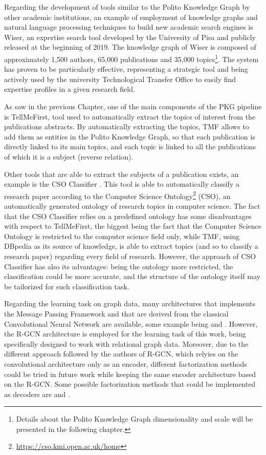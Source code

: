 \documentclass[%
    corpo=13.5pt,
    twoside,
    oldstyle,
    tipotesi=magistrale,
    greek,
    evenboxes
]{toptesi}
\begin{document}
Regarding the development of tools similar to the Polito Knowledge Graph
by other academic institutions, an example of employment of knowledge graphs
and natural language processing techniques to build new academic search engines
is Wiser\cite{cifariello2019}, an
expertise search tool developed by the University of Pisa and publicly released
at the beginning of 2019.
The knowledge graph of Wiser is composed of approximately 1,500 authors, 65,000 publications
and 35,000 topics\footnote{Details about the Polito Knowledge Graph dimensionality and scale
will be presented in the following chapter.}.
The system has proven to be particularly effective, representing a strategic
tool and being actively used by the university Technological Transfer Office to
easily find expertise profiles in a given research field.
\newline

As saw in the previous Chapter, one of the main components of the PKG
pipeline is TellMeFirst, tool used to automatically extract the topics of
interest from the publications abstracts. By automatically extracting the
topics, TMF allows to add them as entities in the Polito Knowledge Graph,
so that each publication is directly linked to its main topics, and each topic
is linked to all the publications of which it is a subject (reverse relation).

Other tools that are able to extract the subjects of a publication exists, an
example is the CSO Classifier \cite{salatino2019}. This tool is able to
automatically classify a research paper according to the Computer Science
Ontology\footnote{\url{https://cso.kmi.open.ac.uk/home}} (CSO), an automatically
generated ontology of research topics in computer science.
The fact that the CSO Classifier relies on a predefined ontology has some
disadvantages with respect to TellMeFirst, the biggest being the fact that the
Computer Science Ontology is restricted to the computer science field only,
while TMF, using DBpedia as its source of knowledge, is able to extract
topics (and so to classify a research paper) regarding every field of research.
However, the approach of CSO Classifier has also its advantages: being the
ontology more restricted, the classification could be more accurate, and the
structure of the ontology itself may be tailorized for such classification task.

Regarding the learning task on graph data, many architectures that implements
the Message Passing Framework\cite{gilmer2017} and that are derived from the
classical Convolutional Neural Network are available, some example being
\cite{defferrard2016} and \cite{duvenaud2015}.
However, the R-GCN architecture is employed for the learning task of this work,
being specifically designed to work with relational graph data.
Moreover, due to the different approach followed by the authors of R-GCN, which
relyies on the convolutional architecture only as an encoder, different
factorization methods could be tried in future work while keeping the
same encoder architecture based on the R-GCN.
Some possible factorization methods that could be implemented
as decoders are \cite{kazemi2018} and \cite{trouillon2016}.
\end{document}

